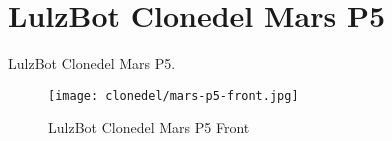 %
%
%
%
%

\section{LulzBot Clonedel Mars P5}
LulzBot Clonedel Mars P5.

\begin{figure}[h!]
\texttt{[image: clonedel/mars-p5-front.jpg]}
 \caption{LulzBot Clonedel Mars P5 Front}
 \label{fig:clonedel-mars-p5-front}
\end{figure}



